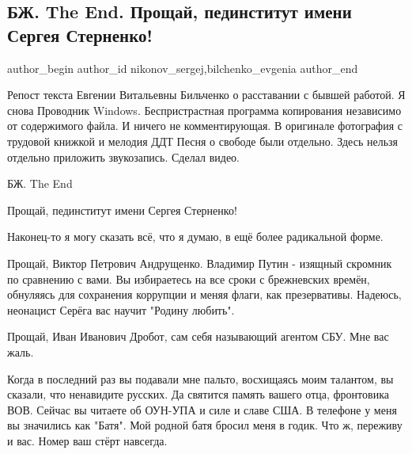  
 
 
 
 
 
\subsection{БЖ. The End. Прощай, пединститут имени Сергея Стерненко!}
\label{sec:16_09_2021.fb.nikonov_sergej.1.bilchenko_theend_institut}
 
\ifcmt
 author_begin
   author_id nikonov_sergej,bilchenko_evgenia
 author_end
\fi

Репост текста Евгении Витальевны Бильченко о расставании с бывшей работой. Я
снова Проводник Windows. Беспристрастная программа копирования независимо от
содержимого файла. И ничего не комментирующая. В оригинале фотография с
трудовой книжкой и мелодия ДДТ Песня о свободе были отдельно. Здесь нельзя
отдельно приложить звукозапись. Сделал видео.

БЖ. The End

Прощай, пединститут имени Сергея Стерненко!

Наконец-то я могу сказать всё, что я думаю, в ещё более радикальной форме.

Прощай, Виктор Петрович Андрущенко. Владимир Путин - изящный скромник по
сравнению с вами. Вы избираетесь на все сроки с брежневских времён, обнуляясь
для сохранения коррупции и меняя флаги, как презервативы. Надеюсь, неонацист
Серёга вас научит "Родину любить".

Прощай, Иван Иванович Дробот, сам себя называющий агентом СБУ. Мне вас жаль.

Когда в последний раз вы подавали мне пальто, восхищаясь моим талантом, вы
сказали, что ненавидите русских. Да святится память вашего отца, фронтовика
ВОВ. Сейчас вы читаете об ОУН-УПА и силе и славе США. В телефоне у меня вы
значились как "Батя". Мой родной батя бросил меня в годик. Что ж, переживу и
вас. Номер ваш стёрт навсегда.

